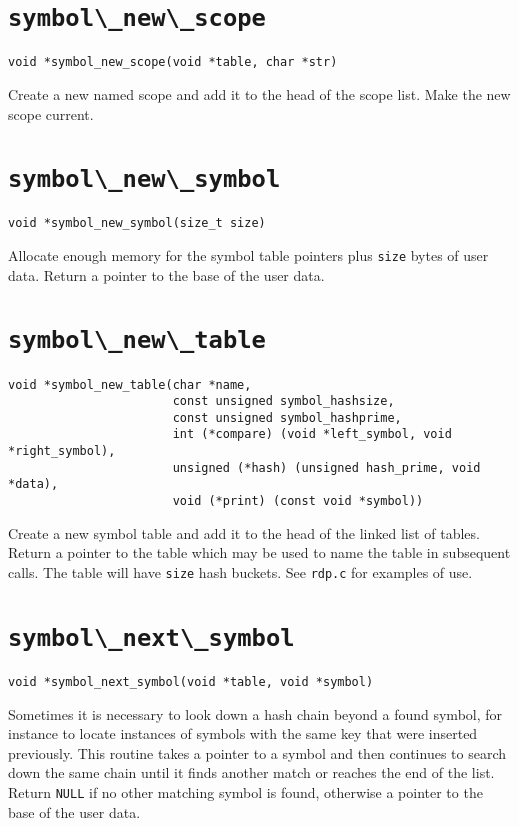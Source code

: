 \section{\protect\verb+symbol\_new\_scope+}
\begin{verbatim}
void *symbol_new_scope(void *table, char *str) 
\end{verbatim}
Create a new named scope and add it to the head of the scope list. Make
the new scope current.

\section{\protect\verb+symbol\_new\_symbol+}
\begin{verbatim}
void *symbol_new_symbol(size_t size) 
\end{verbatim}
Allocate enough memory for the symbol table pointers plus {\tt size}
bytes of user data. Return a pointer to the base of the user data.

\section{\protect\verb+symbol\_new\_table+}
\begin{verbatim}
void *symbol_new_table(char *name,
                       const unsigned symbol_hashsize,
                       const unsigned symbol_hashprime,
                       int (*compare) (void *left_symbol, void *right_symbol),
                       unsigned (*hash) (unsigned hash_prime, void *data),
                       void (*print) (const void *symbol))
\end{verbatim}
Create a new symbol table and add it to the head of the linked list of
tables. Return a pointer to the table which may be used to name the
table in subsequent calls. The table will have {\tt size} hash buckets.
See {\tt rdp.c} for examples of use.

\section{\protect\verb+symbol\_next\_symbol+}
\begin{verbatim}
void *symbol_next_symbol(void *table, void *symbol)
\end{verbatim}
Sometimes it is necessary to look down a hash chain beyond a found
symbol, for instance to locate instances of symbols with the same key
that were inserted previously. This routine takes a pointer to a symbol
and then continues to search down the same chain until it finds another
match or reaches the end of the list. Return {\tt NULL} if no other
matching symbol is found, otherwise a pointer to the base of the user data.

